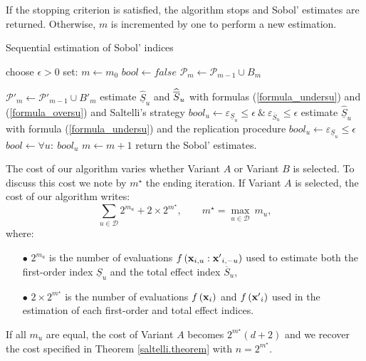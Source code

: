 If the stopping criterion is satisfied, the algorithm stops and Sobol' estimates are returned. Otherwise, $m$ is incremented by one to perform a new estimation. 
\begin{algorithm}[!ht]
\caption{Sequential estimation of Sobol' indices}
\begin{algorithmic}[1]
\vspace*{0.2cm}
\State choose $\epsilon >0$
\State set: $m \leftarrow m_0$
\State $bool \leftarrow false$
\State $\mathcal{P}_m \leftarrow \mathcal{P}_{m-1} \cup B_m$

\hspace*{-0.3cm} $\mathcal{P}'_m \leftarrow \mathcal{P}'_{m-1} \cup {B'}_m$
\State estimate $\widehat{\underline{S}}_u$ and $\widehat{\ov{$S$}}_u$ with formulas (\ref{formula_undersu}) and (\ref{formula_oversu}) and Saltelli's strategy
\State $bool_u \leftarrow \varepsilon_{\underline{S}_u} \leq \epsilon \ \& \ \varepsilon_{\overline{S}_u} \leq \epsilon$
\EndIf
{}
\State estimate $\widehat{\underline{S}}_u$ with formula (\ref{formula_undersu}) and the replication procedure
\State $bool_u \leftarrow \varepsilon_{\underline{S}_u} \leq \epsilon$
\EndIf
\EndFor
\State $bool \leftarrow \forall u: \ bool_u$
\State $m \leftarrow m + 1$
\EndWhile
\State return the Sobol' estimates.
\end{algorithmic}
\label{recursive.algorithm}
\end{algorithm}
\bigskip

The cost of our algorithm varies whether Variant $A$ or Variant $B$ is selected. To discuss this cost we note by $m^\star$ the ending iteration. If Variant $A$ is selected, the cost of our algorithm writes:
\[\sum \limits_{u \in \mathcal{D}} 2^{m_u} + 2 \times 2^{m^{\star}}, \qquad m^\star= \max \limits_{u \in \mathcal{D}} \ m_u,\]
where: 
\begin{itemize}
\item[$\bullet$] $2^{m_u}$ is the number of evaluations $f\left(\boldsymbol{\mathbf{x}}_{i,u}:{\boldsymbol{\mathbf{x}}'}_{i,-u}\right)$ used to estimate both the first-order index $\underline{S}_u$ and the total effect index $\overline{S}_u$,
\item[$\bullet$] $2 \times 2^{m^{\star}}$ is the number of evaluations $f\left(\boldsymbol{\mathbf{x}}_{i}\right)$ and $f\left({\boldsymbol{\mathbf{x}}'}_{i}\right)$ used in the estimation of each first-order and total effect indices.
\end{itemize}
If all $m_u$ are equal, the cost of Variant $A$ becomes $2^{m^\star}(d+2)$ and we recover the cost specified in Theorem \ref{saltelli.theorem} with $n=2^{m^\star}$.

